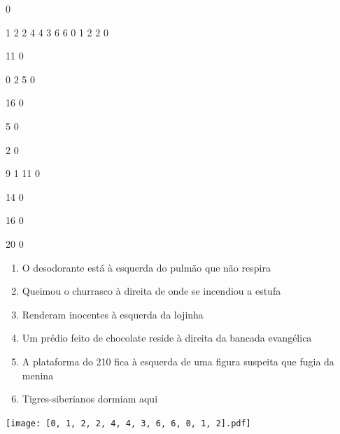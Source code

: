 \documentclass[12pt]{article}
\begin{document}
		\vfill  
		  
{
	0	%

	1	%
	2	%
	2	%
	4	%
	4	%
	3	%
	6	%
	6	%
	0	%
	1	%
	2	%
	2	%
	0	%

	11	%
	0	%

	0	%
	2	%
	5	%
	0	%

	16	%
	0	%

	5	%
	0	%

	2	%
	0	%

	9	%
	1	%
	11	%
	0	%

	14	%
	0	%

	16	%
	0	%

	20	%
	0	%

}	  
		    	

		 

\pagebreak


	\begin{enumerate}
		  \sffamily %
		  \large %


\vfill \item
O desodorante está	%
à esquerda
do pulmão que não respira	%

\vfill \item
Queimou o churrasco	%
à direita
de onde se incendiou a estufa	%

\vfill \item
Renderam inocentes	%
à esquerda
da lojinha	%

\vfill \item
Um prédio feito de chocolate reside	%
à direita
da bancada evangélica	%

\vfill \item
A plataforma do 210 fica	%
à esquerda
de uma figura suspeita que fugia da menina	%

\vfill \item
Tigres-siberianos dormiam	%
aqui	%
	\end{enumerate}
		  
		  \hfill

		  \vfill

\texttt{[image: [0, 1, 2, 2, 4, 4, 3, 6, 6, 0, 1, 2].pdf]}
\end{document}
